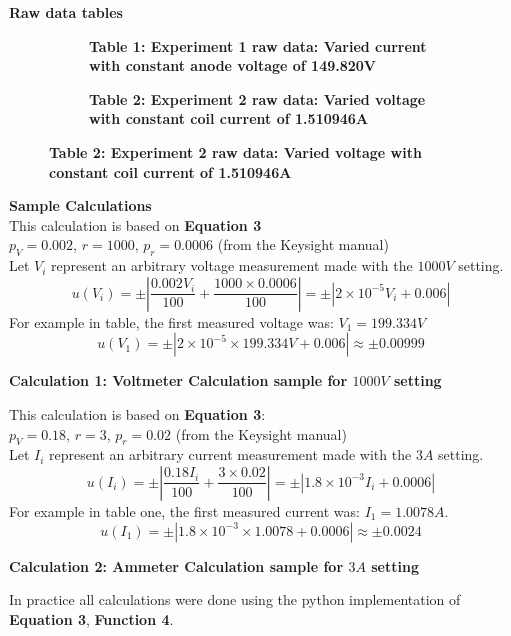 \documentclass[
	letterpaper, %
	10pt, %
]{CSUniSchoolLabReport}
\begin{document}
\newpage
{\Large\textbf{Raw data tables}}
\begin{figure}[H]
	\begin{subfigure}{0.45\textwidth}
		
		\caption{\textbf{Table 1: Experiment 1 raw data: Varied current with constant anode voltage of 149.820V}}
	\end{subfigure}
	\hspace*{\fill}
	\begin{subfigure}{0.45\textwidth}
		
		\caption{\textbf{Table 2: Experiment 2 raw data: Varied voltage with constant coil current of 1.510946A}}
	\end{subfigure}
\end{figure}
\newpage
{\large\textbf{Sample Calculations}}\\
This calculation is based on \textbf{Equation 3}\\
$p_V=0.002$, $r=1000$, $p_r=0.0006$ (from the Keysight manual)\\
Let $V_i$ represent an arbitrary voltage measurement made with the $1000V$ setting.\\
$$ u(V_i) = \pm\left|\frac{0.002V_i}{100} + \frac{1000 \times 0.0006}{100}\right| = \pm\left|2\times 10^{-5}V_i+0.006\right|$$
For example in table, the first measured voltage was: $V_1=199.334V$\\
$$ u(V_1) = \pm\left|2\times 10^{-5} \times 199.334V + 0.006\right| \approx \pm 0.00999$$
\begin{center}
    \textbf{Calculation 1: Voltmeter Calculation sample for $1000V$ setting}\\
\end{center}

\vspace{10pt}
This calculation is based on \textbf{Equation 3}:\\
$p_V=0.18$, $r=3$, $p_r=0.02$ (from the Keysight manual)\\
Let $I_i$ represent an arbitrary current measurement made with the $3A$ setting.\\
$$u(I_i) = \pm\left|\frac{0.18I_i}{100} + \frac{3 \times 0.02}{100}\right| = \pm\left|1.8\times10^{-3}I_i + 0.0006\right|$$
For example in table one, the first measured current was: $I_1 = 1.0078A$.
$$ u(I_1) = \pm\left|1.8\times10^{-3}\times1.0078 + 0.0006\right|\approx \pm 0.0024$$
\begin{center}
    \textbf{Calculation 2: Ammeter Calculation sample for $3A$ setting}
\end{center}
In practice all calculations were done using the python implementation of \textbf{Equation 3}, \textbf{Function 4}.
\end{document}
